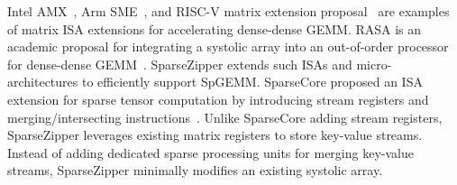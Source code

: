 Intel AMX~\cite{intel-amx-web,nassif-intel-sapphire-isscc2022}, Arm
SME~\cite{arm-sme-web}, and RISC-V matrix extension
proposal~\cite{riscv-mtx-ext-proposal-web} are examples of matrix ISA
extensions for accelerating dense-dense GEMM.
RASA is an academic proposal for integrating a systolic array into an
out-of-order processor for dense-dense GEMM~\cite{jeong-rasa-dac2021}.
SparseZipper extends such ISAs and micro-architectures to
efficiently support SpGEMM.
SparseCore proposed an ISA extension for sparse tensor computation by
introducing stream registers and merging/intersecting
instructions~\cite{rao-sparsecore-asplos2022}.
Unlike SparseCore adding stream registers, SparseZipper leverages existing
matrix registers to store key-value streams.
Instead of adding dedicated sparse processing units for merging key-value
streams, SparseZipper minimally modifies an existing systolic array.
